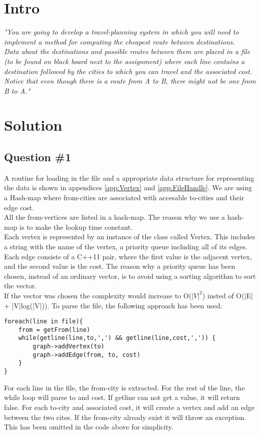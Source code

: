 \section{Intro}
\label{sec:intro}
\textit{"You are going to develop a travel-planning system in which you will need to implement a method for computing the cheapest route between destinations. \\
Data about the destinations and possible routes between them are placed in a file (to be found on black board next to the assignment) where each line contains a destination followed by the cities to which you can travel and the associated cost. \\
Notice that even though there is a route from A to B, there might not be one from B to A."}


\section{Solution}
\subsection{Question \#1}
A routine for loading in the file and a appropriate data structure for representing the data is shown in appendices  \ref{app:Vertex} and \ref{app:FileHandle}. We are using a Hash-map where from-cities are associated with accesable to-cities and their edge cost.\\
All the from-vertices are listed in a hash-map. The reason why we use a hash-map is to make the lookup time constant. \\
Each vertex is represented by an instance of the class called Vertex. This includes a string with the name of the vertex, a priority queue including all of its edges. Each edge consists of a C++11 pair, where the first value is the adjacent vertex, and the second value is the cost. The reason why a priority queue has been chosen, instead of an ordinary vector, is to avoid using a sorting algorithm to sort the vector.\\
If the vector was chosen the complexity would increase to O($|V|^2$) insted of O(|E| + |V|log(|V|)).
To parse the file, the following approach has been used:
\bigskip
\begin{lstlisting}
foreach(line in file){
	from = getFrom(line)
	while(getline(line,to,',') && getline(line,cost,',')) {
		graph->addVertex(to)
		graph->addEdge(from, to, cost)
	}	
}
\end{lstlisting}
\bigskip
For each line in the file, the from-city is extracted. For the rest of the line, the while loop will parse to and cost. If getline can not get a value, it will return false. For each to-city and associated cost, it will create a vertex and add an edge between the two cites. If the from-city already exist it will throw an exception. This has been omitted in the code above for simplicity.


